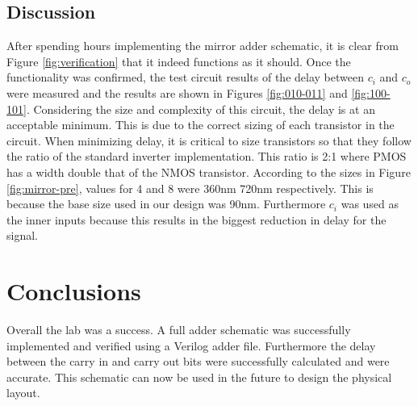 \documentclass[12pt]{article}
\begin{document}
\subsection{Discussion}
After spending hours implementing the mirror adder schematic, it is clear from Figure \ref{fig:verification} that it indeed functions as it should. Once the functionality was confirmed, the test circuit results of the delay between $c_i$ and $c_o$ were measured and the results are shown in Figures \ref{fig:010-011} and \ref{fig:100-101}. Considering the size and complexity of this circuit, the delay is at an acceptable minimum. This is due to the correct sizing of each transistor in the circuit. When minimizing delay, it is critical to size transistors so that they follow the ratio of the standard inverter implementation. This ratio is 2:1 where PMOS has a width double that of the NMOS transistor. According to the sizes in Figure \ref{fig:mirror-pre}, values for 4 and 8 were 360nm 720nm respectively. This is because the base size used in our design was 90nm. Furthermore $c_i$ was used as the inner inputs because this results in the biggest reduction in delay for the signal.

	
\section{Conclusions}
Overall the lab was a success. A full adder schematic was successfully implemented and verified using a Verilog adder file. Furthermore the delay between the carry in and carry out bits were successfully calculated and were accurate. This schematic can now be used in the future to design the physical layout.
\end{document}
